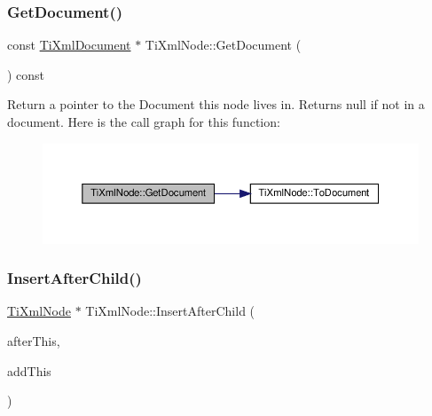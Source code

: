\subsubsection{\texorpdfstring{Get\+Document()}{GetDocument()}}
{\footnotesize\ttfamily const \hyperlink{classTiXmlDocument}{Ti\+Xml\+Document} $\ast$ Ti\+Xml\+Node\+::\+Get\+Document (\begin{DoxyParamCaption}{ }\end{DoxyParamCaption}) const}

Return a pointer to the Document this node lives in. Returns null if not in a document. Here is the call graph for this function\+:
\nopagebreak
\begin{figure}[H]
\begin{center}
\leavevmode
\includegraphics[width=350pt]{classTiXmlNode_adcb070acefcbaedaa0673d82e530538b_cgraph}
\end{center}
\end{figure}
\mbox{\label{classTiXmlNode_a274db3292218202805c093f66a964cb5}} 
\subsubsection{\texorpdfstring{Insert\+After\+Child()}{InsertAfterChild()}}
{\footnotesize\ttfamily \hyperlink{classTiXmlNode}{Ti\+Xml\+Node} $\ast$ Ti\+Xml\+Node\+::\+Insert\+After\+Child (\begin{DoxyParamCaption}\item[{\hyperlink{classTiXmlNode}{Ti\+Xml\+Node} $\ast$}]{after\+This,  }\item[{const \hyperlink{classTiXmlNode}{Ti\+Xml\+Node} \&}]{add\+This }\end{DoxyParamCaption})}

